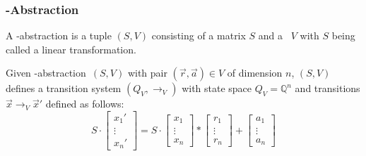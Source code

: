 \begin{frame}
	\frametitle{\qvasr-Abstraction}
	\newcommand{\s}{\ensuremath{\begin{bmatrix} s_x & s_y & s_z \end{bmatrix}}}
	\newcommand{\p}{\ensuremath{\begin{bmatrix} x' \\ y' \\ z' \end{bmatrix}}}
	\newcommand{\up}{\ensuremath{\begin{bmatrix} x \\ y \\ z \end{bmatrix}}}
	\begin{definition}
		A \qvasr-abstraction is a tuple $(S, V)$ consisting of a matrix $S$ and a \qvasr\ $V$ with $S$ being called a linear transformation.
	\end{definition}
	\begin{center}
		\onslide<+->
		Given \qvasr-abstraction\ $(S, V)$ with pair $(\vec{r}, \vec{a}) \in V$ of dimension $n$, $(S, V)$ defines a transition system $(Q_V, \rightarrow_V)$ with state space $Q_V =  \mathbb{Q}^n$  and transitions $\vec{x} \rightarrow_V \vec{x}'$ defined as follows: \\
		\begin{equation}
		S \cdot
		\begin{bmatrix}
			x_1' \\
			\vdots \\
			x_n'
		\end{bmatrix}
		=
		S \cdot
		\begin{bmatrix}
			x_1 \\
			\vdots \\
			x_n
		\end{bmatrix}
		*
			\begin{bmatrix}
				r_1 \\
				\vdots \\
				r_n
			\end{bmatrix}
		+
		\begin{bmatrix}
			a_1 \\
			\vdots \\
			a_n
		\end{bmatrix}
		\end{equation}	
	\end{center}
\end{frame}


